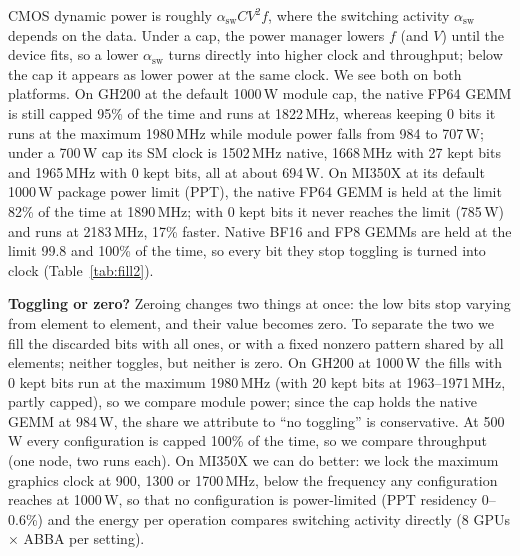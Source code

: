\documentclass[conference]{IEEEtran}
\newcommand{\W}{\,W}
\newcommand{\pct}{\%}
\begin{document}
CMOS dynamic power is roughly $\alpha_\mathrm{sw} C V^2 f$, where the switching activity $\alpha_\mathrm{sw}$ depends
on the data. Under a cap, the power manager lowers $f$ (and $V$) until the device fits, so a lower $\alpha_\mathrm{sw}$
turns directly into higher clock and throughput; below the cap it appears as lower power at the same clock. We see
both on both platforms. On GH200 at the default 1000\W{} module cap, the native FP64 GEMM is still capped 95\pct{} of
the time and runs at 1822\,MHz, whereas keeping 0 bits it runs at the maximum 1980\,MHz while module power falls from
984 to 707\W; under a 700\W{} cap its SM clock is 1502\,MHz native, 1668\,MHz with 27 kept bits and 1965\,MHz with 0
kept bits, all at about 694\W. On MI350X at its default 1000\W{} package power limit (PPT), the native FP64 GEMM is
held at the limit 82\pct{} of the time at 1890\,MHz; with 0 kept bits it never reaches the limit (785\W) and runs at
2183\,MHz, 17\pct{} faster. Native BF16 and FP8 GEMMs are held at the limit 99.8 and 100\pct{} of the time, so every
bit they stop toggling is turned into clock (Table~\ref{tab:fill2}).

\textbf{Toggling or zero?} Zeroing changes two things at once: the low bits stop varying from element to element,
and their value becomes zero. To separate the two we fill the discarded bits with all ones, or with a fixed
nonzero pattern shared by all elements; neither toggles, but neither is zero. On GH200 at 1000\W{} the fills with 0 kept
bits run at the maximum 1980\,MHz (with 20 kept bits at 1963--1971\,MHz, partly capped), so we compare module power;
since the cap holds the native GEMM at 984\W, the share we attribute to ``no toggling'' is conservative. At 500\W{}
every configuration is capped 100\pct{} of the time, so we compare throughput (one node, two runs each). On MI350X we
can do better: we lock the maximum graphics clock at 900, 1300 or 1700\,MHz, below the frequency any configuration
reaches at 1000\W, so that no configuration is power-limited (PPT residency 0--0.6\pct) and the energy per
operation compares switching activity directly (8 GPUs $\times$ ABBA per setting).
\end{document}
